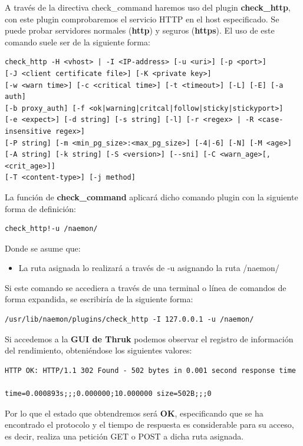 A través de la directiva check\_command haremos uso del plugin \textbf{check\_http}, con este plugin comprobaremos el servicio HTTP en el host especificado. Se puede probar
servidores normales (\textbf{http}) y seguros (\textbf{https}).
El uso de este comando suele ser de la siguiente forma:
\begin{lstlisting}
check_http -H <vhost> | -I <IP-address> [-u <uri>] [-p <port>]
[-J <client certificate file>] [-K <private key>]
[-w <warn time>] [-c <critical time>] [-t <timeout>] [-L] [-E] [-a auth]
[-b proxy_auth] [-f <ok|warning|critcal|follow|sticky|stickyport>]
[-e <expect>] [-d string] [-s string] [-l] [-r <regex> | -R <case-insensitive regex>]
[-P string] [-m <min_pg_size>:<max_pg_size>] [-4|-6] [-N] [-M <age>]
[-A string] [-k string] [-S <version>] [--sni] [-C <warn_age>[,<crit_age>]]
[-T <content-type>] [-j method]
\end{lstlisting}
\newpage
La función de \textbf{check\_command} aplicará dicho comando plugin con la siguiente forma de definición:
\begin{lstlisting}	
check_http!-u /naemon/
\end{lstlisting} 

Donde se asume que:
\begin{itemize}
	\item La ruta asignada lo realizará a través de -u asignando la ruta /naemon/
\end{itemize}

Si este comando se accediera a través de una terminal o línea de comandos de forma expandida, se escribiría de la siguiente forma:

\begin{lstlisting}
/usr/lib/naemon/plugins/check_http -I 127.0.0.1 -u /naemon/
\end{lstlisting}

Si accedemos a la \textbf{GUI de Thruk} podemos observar el registro de información del rendimiento, obteniéndose los siguientes valores:

\begin{lstlisting}
HTTP OK: HTTP/1.1 302 Found - 502 bytes in 0.001 second response time

time=0.000893s;;;0.000000;10.000000 size=502B;;;0

\end{lstlisting}

Por lo que el estado que obtendremos será \textbf{OK}, especificando que se ha encontrado el protocolo y el tiempo de respuesta es considerable para su acceso, es decir, realiza una petición GET o POST a dicha ruta asignada.

